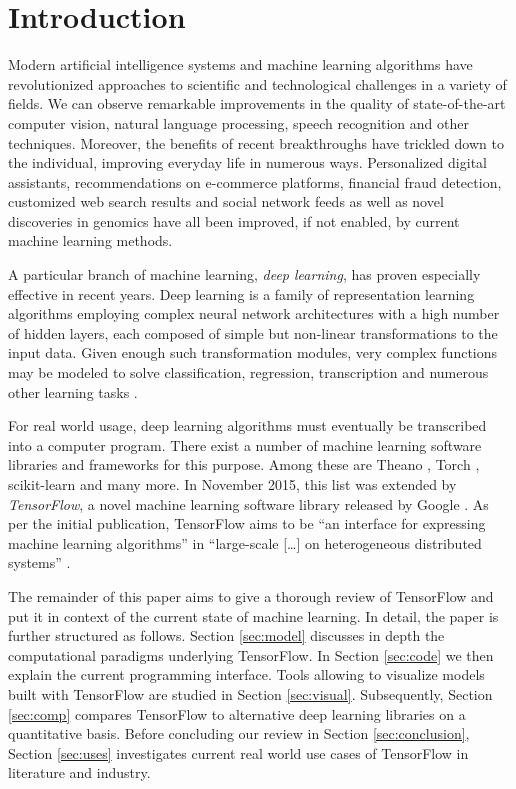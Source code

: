 \section{Introduction}

Modern artificial intelligence systems and machine learning algorithms have
revolutionized approaches to scientific and technological challenges in a
variety of fields. We can observe remarkable improvements in the quality of
state-of-the-art computer vision, natural language processing, speech
recognition and other techniques. Moreover, the benefits of recent breakthroughs
have trickled down to the individual, improving everyday life in numerous
ways. Personalized digital assistants, recommendations on e-commerce platforms,
financial fraud detection, customized web search results and social network
feeds as well as novel discoveries in genomics have all been improved, if not
enabled, by current machine learning methods.

A particular branch of machine learning, \emph{deep learning}, has proven
especially effective in recent years. Deep learning is a family of
representation learning algorithms employing complex neural network
architectures with a high number of hidden layers, each composed of simple but
non-linear transformations to the input data. Given enough such transformation
modules, very complex functions may be modeled to solve classification,
regression, transcription and numerous other learning tasks \cite{nature2015}.

For real world usage, deep learning algorithms must eventually be transcribed
into a computer program. There exist a number of machine learning software
libraries and frameworks for this purpose. Among these are Theano \cite{theano},
Torch \cite{torch}, scikit-learn \cite{scikit} and many more. In November 2015,
this list was extended by \emph{TensorFlow}, a novel machine learning software
library released by Google \cite{tensorflow}. As per the initial publication,
TensorFlow aims to be ``an interface for expressing machine learning
algorithms'' in ``large-scale [\dots] on heterogeneous distributed systems''
\cite{tensorflow}.

The remainder of this paper aims to give a thorough review of TensorFlow and put
it in context of the current state of machine learning. In detail, the paper is
further structured as follows. Section \ref{sec:model} discusses in depth the
computational paradigms underlying TensorFlow. In Section \ref{sec:code} we then
explain the current programming interface. Tools allowing to visualize models
built with TensorFlow are studied in Section \ref{sec:visual}. Subsequently,
Section \ref{sec:comp} compares TensorFlow to alternative deep learning
libraries on a quantitative basis. Before concluding our review in Section
\ref{sec:conclusion}, Section \ref{sec:uses} investigates current real world use
cases of TensorFlow in literature and industry.

